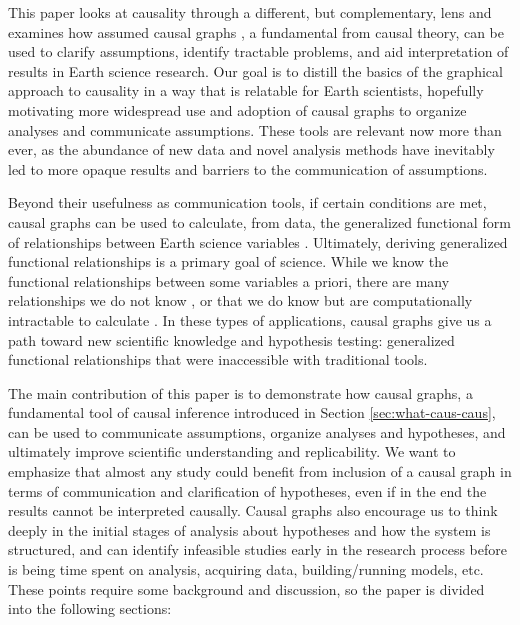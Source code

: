 \documentclass[12pt]{article}
\begin{document}
This paper looks at causality through a different, but complementary,
lens and examines how assumed causal graphs \citep{pearl1995causal}, a
fundamental from causal theory, can be used to clarify assumptions,
identify tractable problems, and aid interpretation of results in
Earth science research. Our goal is to distill the
basics of the graphical approach to causality \citep{olah2017} in a way that is
relatable for Earth scientists, hopefully motivating more widespread
use and adoption of causal graphs to organize analyses and communicate
assumptions. These tools are relevant now more than ever, as the
abundance of new data and novel analysis methods have inevitably led to more
opaque results and barriers to the communication of assumptions.

Beyond their usefulness as communication tools, if certain conditions
are met, causal graphs can be used to calculate, from data, the
generalized functional form of relationships between Earth science
variables \citep{pearl2009causality}. Ultimately, deriving generalized
functional relationships is a primary goal of science. While we know
the functional relationships between some variables a priori, there
are many relationships we do not know \citep[e.g., ecosystem scale
water and carbon fluxes;][]{massmann2019, zhou2019arid,
  zhou2019feedback, grossiord2020}, or that we do know but are
computationally intractable to calculate \citep[e.g., clouds and
microphysics at the global scale:][]{randall2003, gentine2018,
  zadra2018, gagne2020emulation}. In these types of applications,
causal graphs give us a path toward new scientific knowledge and
hypothesis testing: generalized functional relationships that were
inaccessible with traditional tools.

The main contribution of this paper is to demonstrate how causal
graphs, a fundamental tool of causal inference introduced in Section
\ref{sec:what-caus-caus}, can be used to communicate assumptions,
organize analyses and hypotheses, and ultimately improve scientific understanding and replicability. We
want to emphasize that almost any study could benefit from inclusion
of a causal graph in terms of communication and clarification of hypotheses, even if
in the end the results cannot be interpreted causally. Causal graphs
also encourage us to think deeply in the initial stages of analysis
about hypotheses and how the system is structured, and can
identify infeasible studies early in the research process before is being time
spent on analysis, acquiring data, building/running models,
etc. These points require some background and discussion, so the
paper is divided into the following sections:
\end{document}
